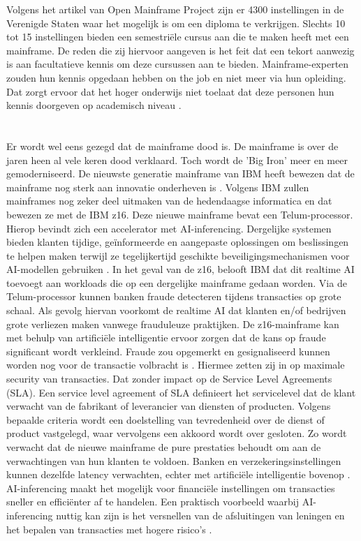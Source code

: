 Volgens het artikel van Open Mainframe Project \autocite{2020} zijn er 4300 instellingen in de Verenigde Staten waar het mogelijk is om een diploma te verkrijgen. Slechts 10 tot 15 instellingen bieden een semestriële cursus aan die te maken heeft met een mainframe. De reden die zij hiervoor aangeven is het feit dat een tekort aanwezig is aan facultatieve kennis om deze cursussen aan te bieden. Mainframe-experten zouden hun kennis opgedaan hebben on the job en niet meer via hun opleiding. Dat zorgt ervoor dat het hoger onderwijs niet toelaat dat deze personen hun kennis doorgeven op academisch niveau \autocite{2020}. 

\section{}
\label{sec:De laatste nieuwe mainframe technologie}

Er wordt wel eens gezegd dat de mainframe dood is. De mainframe is over de jaren heen al vele keren dood verklaard. Toch wordt de 'Big Iron' meer en meer gemoderniseerd. De nieuwste generatie mainframe van IBM heeft bewezen dat de mainframe nog sterk aan innovatie onderheven is \autocite{Almekinders2022}. Volgens IBM zullen mainframes nog zeker deel uitmaken van de hedendaagse informatica en dat bewezen ze met de IBM z16. Deze nieuwe mainframe bevat een Telum-processor. Hierop bevindt zich een accelerator met AI-inferencing. Dergelijke systemen bieden klanten tijdige, geïnformeerde en aangepaste oplossingen om beslissingen te helpen maken terwijl ze tegelijkertijd geschikte beveiligingsmechanismen voor AI-modellen gebruiken \autocite{Cammarota2020}. In het geval van de z16, belooft IBM dat dit realtime AI toevoegt aan workloads die op een dergelijke mainframe gedaan worden. Via de Telum-processor kunnen banken fraude detecteren tijdens transacties op grote schaal. Als gevolg hiervan voorkomt de realtime AI dat klanten en/of bedrijven grote verliezen maken vanwege frauduleuze praktijken. De z16-mainframe kan met behulp van artificiële intelligentie ervoor zorgen dat de kans op fraude significant wordt verkleind. Fraude zou opgemerkt en gesignaliseerd kunnen worden nog voor de transactie volbracht is \autocite{Saran2022}. Hiermee zetten zij in op maximale security van transacties. Dat zonder impact op de Service Level Agreements (SLA). Een service level agreement of SLA definieert het servicelevel dat de klant verwacht van de fabrikant of leverancier van diensten of producten. Volgens bepaalde criteria wordt een doelstelling van tevredenheid over de dienst of product vastgelegd, waar vervolgens een akkoord wordt over gesloten. Zo wordt verwacht dat de nieuwe mainframe de pure prestaties behoudt om aan de verwachtingen van hun klanten te voldoen. Banken en verzekeringsinstellingen kunnen dezelfde latency verwachten, echter met artificiële intelligentie bovenop \autocite{Saran2022}. AI-inferencing maakt het mogelijk voor financiële instellingen om transacties sneller en efficiënter af te handelen. Een praktisch voorbeeld waarbij AI-inferencing nuttig kan zijn is het versnellen van de afsluitingen van leningen en het bepalen van transacties met hogere risico's \autocite{Saran2022}.


